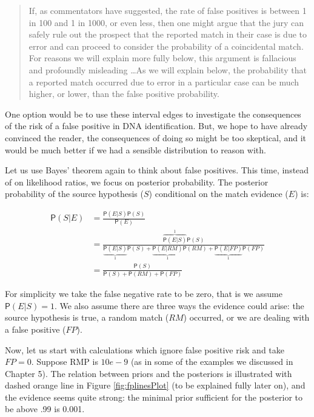 \documentclass[
  10pt,
  dvipsnames,enabledeprecatedfontcommands]{scrartcl}
\newcommand{\pr}[1]{\mathsf{P}(#1)}
\begin{document}
\begin{quote}
If, as commentators have suggested, the rate of false positives is between 1 in 100 and 1 in 1000, or even less, then one might argue that the jury can safely rule out
the prospect that the reported match in their case is due to error and can proceed to consider the probability of a coincidental match. For reasons we will explain more fully below, this argument is fallacious and profoundly misleading \dots As we will explain below, the probability that a reported match occurred due to error in a particular case can be much higher, or lower, than the false positive probability. 
\end{quote}

One option would be to use these interval edges to investigate the
consequences of the risk of a false positive in DNA identification. But,
we hope to have already convinced the reader, the consequences of doing
so might be too skeptical, and it would be much better if we had a
sensible distribution to reason with.

Let us use Bayes' theorem again to think about false positives. This
time, instead of on likelihood ratios, we focus on posterior
probability. The posterior probability of the source hypothesis (\(S\))
conditional on the match evidence (\(E\)) is:

\begin{align*}
\pr{S \vert E} &   =  \frac{\pr{E\vert S} \pr{S} } {\pr{E}}\\
& = \frac{\overbrace{\pr{E\vert S}}^1 \pr{S}}{\underbrace{\pr{E\vert S}}_1 \pr{S} + \underbrace{\pr{E \vert RM}}_1 \pr{RM} + \underbrace{\pr{E \vert FP}}_1 \pr{FP}} \\ & = \frac{\pr{S}}{\pr{S} + \pr{RM} + \pr{FP}} 
\end{align*}

For simplicity we take the false negative rate to be zero, that is we
assume \(\pr{E\vert S} =1\). We also assume there are three ways the
evidence could arise: the source hypothesis is true, a random match
(\(RM\)) occurred, or we are dealing with a false positive (\(FP\)).

Now, let us start with calculations which ignore false positive risk and
take \(FP=0\). Suppose RMP is \(10e-9\) (as in some of the examples we
discussed in Chapter 5). The relation between priors and the posteriors
is illustrated with dashed orange line in Figure \ref{fig:fplinesPlot}
(to be explained fully later on), and the evidence seems quite strong:
the minimal prior sufficient for the posterior to be above .99 is 0.001.
\end{document}
